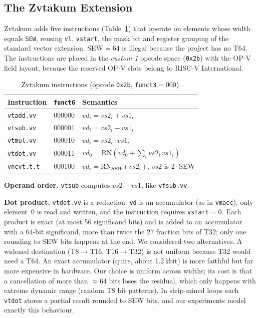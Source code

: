 \subsection{The Zvtakum Extension}
Zvtakum adds five instructions (Table~\ref{tab:zvt}) that operate on elements whose width equals
\texttt{SEW}, reusing \texttt{vl}, \texttt{vstart}, the mask bit and register grouping of
the standard vector extension. SEW$=64$ is illegal because the project has no T64.
The instructions are placed in the \emph{custom-1} opcode space (\texttt{0x2b}) with the OP-V field layout, because the
reserved OP-V slots belong to RISC-V International.

\begin{table}[t]
\caption{Zvtakum instructions (opcode \texttt{0x2b}, \texttt{funct3}$=000$).}
\label{tab:zvt}
\centering
\small
\begin{tabular}{@{}lll@{}}
\toprule
Instruction & \texttt{funct6} & Semantics \\
\midrule
\texttt{vtadd.vv}  & 000000 & $vd_i = vs2_i + vs1_i$ \\
\texttt{vtsub.vv}  & 000001 & $vd_i = vs2_i - vs1_i$ \\
\texttt{vtmul.vv}  & 000010 & $vd_i = vs2_i \cdot vs1_i$ \\
\texttt{vtdot.vv}  & 000011 & $vd_0 = \mathrm{RN}(vd_0+\sum_i vs2_i\,vs1_i)$ \\
\texttt{vncvt.t.t} & 000100 & $vd_i=\mathrm{RN}_{SEW}(vs2_i)$, $vs2$ is $2\!\cdot\!$SEW \\
\bottomrule
\end{tabular}
\end{table}

\textbf{Operand order.} \texttt{vtsub} computes $vs2-vs1$, like \texttt{vfsub.vv}.

\textbf{Dot product.} \texttt{vtdot.vv} is a reduction: \texttt{vd} is an accumulator (as in \texttt{vmacc}), only
element~0 is read and written, and the instruction requires \texttt{vstart}$=0$. Each product is exact (at most 56
significand bits) and is added to an accumulator with a 64-bit significand, more than twice the 27 fraction bits of T32;
only one rounding to SEW bits happens at the end. We considered two alternatives. A widened destination
(T8$\rightarrow$T16, T16$\rightarrow$T32) is not uniform because T32 would need a T64. An exact accumulator (quire, about
1.2\,kbit) is more faithful but far more expensive in hardware. Our choice is uniform across widths; its cost is that a cancellation of more
than $\approx$64 bits loses the residual, which only happens with extreme dynamic range (random T8 bit patterns).
In strip-mined loops each \texttt{vtdot} stores a partial result rounded to SEW bits, and our experiments model exactly this behaviour.


